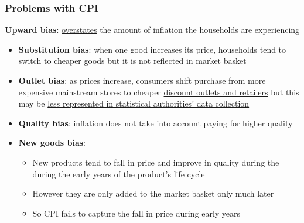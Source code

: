 \documentclass{article}
\begin{document}
\begin{multicols}{2}
\subsubsection{Problems with CPI}
\textbf{Upward bias}: \underline{overstates} the amount of inflation the households are experiencing
\begin{itemize}
	\item \textbf{Substitution bias}: when one good increases its price, households tend to switch to cheaper goods but it is not reflected in market basket
	\item \textbf{Outlet bias}: as prices increase, consumers shift purchase from more expensive mainstream stores to cheaper \underline{discount outlets and retailers} but this may be \underline{less represented in statistical authorities' data collection}
	\item \textbf{Quality bias}: inflation does not take into account paying for higher quality
	\item \textbf{New goods bias}:
	\begin{itemize}
		\item New products tend to fall in price and improve in quality during the during the early years of the product's life cycle
		\item However they are only added to the market basket only much later
		\item So CPI fails to capture the fall in price during early years
	\end{itemize}
\end{itemize}


\end{multicols}
\end{document}
